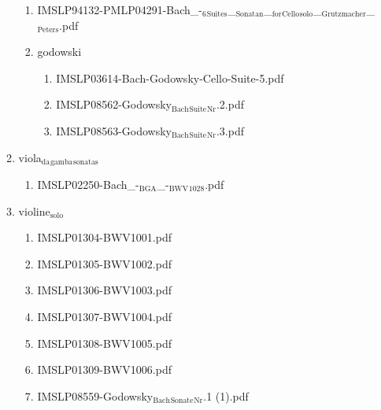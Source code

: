 \documentclass[11pt]{article}
\begin{document}
\begin{enumerate}
\begin{enumerate}
\begin{enumerate}
\item IMSLP94132-PMLP04291-Bach\_-$_{\text{6}}$$_{\text{Suites}}$\_$_{\text{Sonatan}}$\_$_{\text{for}}$$_{\text{Cello}}$$_{\text{solo}}$\_$_{\text{Grutzmacher}}$\_$_{\text{Peters}}$.pdf
\label{sec-1-1-1-1-44-6-2-1-11}

\item godowski
\label{sec-1-1-1-1-44-6-2-1-12}
\begin{enumerate}
\item IMSLP03614-Bach-Godowsky-Cello-Suite-5.pdf
\label{sec-1-1-1-1-44-6-2-1-12-1}

\item IMSLP08562-Godowsky$_{\text{Bach}}$$_{\text{Suite}}$$_{\text{Nr}}$.2.pdf
\label{sec-1-1-1-1-44-6-2-1-12-2}

\item IMSLP08563-Godowsky$_{\text{Bach}}$$_{\text{Suite}}$$_{\text{Nr}}$.3.pdf
\label{sec-1-1-1-1-44-6-2-1-12-3}
\end{enumerate}
\end{enumerate}

\item viola$_{\text{da}}$$_{\text{gamba}}$$_{\text{sonatas}}$
\label{sec-1-1-1-1-44-6-2-2}
\begin{enumerate}
\item IMSLP02250-Bach\_-$_{\text{BGA}}$\_-$_{\text{BWV}}$$_{\text{1028}}$.pdf
\label{sec-1-1-1-1-44-6-2-2-1}
\end{enumerate}

\item violine$_{\text{solo}}$
\label{sec-1-1-1-1-44-6-2-3}
\begin{enumerate}
\item IMSLP01304-BWV1001.pdf
\label{sec-1-1-1-1-44-6-2-3-1}

\item IMSLP01305-BWV1002.pdf
\label{sec-1-1-1-1-44-6-2-3-2}

\item IMSLP01306-BWV1003.pdf
\label{sec-1-1-1-1-44-6-2-3-3}

\item IMSLP01307-BWV1004.pdf
\label{sec-1-1-1-1-44-6-2-3-4}

\item IMSLP01308-BWV1005.pdf
\label{sec-1-1-1-1-44-6-2-3-5}

\item IMSLP01309-BWV1006.pdf
\label{sec-1-1-1-1-44-6-2-3-6}

\item IMSLP08559-Godowsky$_{\text{Bach}}$$_{\text{Sonate}}$$_{\text{Nr}}$.1 (1).pdf
\label{sec-1-1-1-1-44-6-2-3-7}


\end{enumerate}
\end{enumerate}
\end{enumerate}
\end{document}
